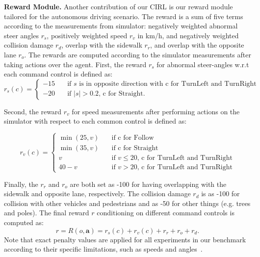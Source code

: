 \documentclass[runningheads]{llncs}
\begin{document}
\noindent\textbf{Reward Module.} Another contribution of our CIRL is our reward module tailored for the autonomous driving scenario. The reward is a sum of five terms according to the measurements from simulator: negatively weighted abnormal steer angles $r_s$, positively weighted speed $r_v$ in km/h, and negatively weighted collision damage $r_d$, overlap with the sidewalk $r_r$, and overlap with the opposite lane $r_o$. The rewards are computed according to the simulator measurements after taking actions over the agent. First, the reward $r_s$ for abnormal steer-angles w.r.t each command control is defined as:
\begin{equation}
     r_s(c) =
  \begin{cases}
    -15       & \quad \text{if } s \text{ is in opposite direction with c for TurnLeft and TurnRight}\\
    -20  & \quad \text{if } |s| > 0.2 \text{, c for Straight.}
  \end{cases}
\end{equation}

Second, the reward $r_v$ for speed measurements after performing actions on the simulator with respect to each common control is defined as:

\begin{equation}
     r_v(c) =
  \begin{cases}
    \min(25,v)      & \quad \text{if } \text{c for Follow}\\
    \min(35,v)  & \quad \text{if }\text{c for Straight}\\
    v & \quad \text{if } v \leq 20 \text{, c for TurnLeft and TurnRight}\\
    40 - v & \quad \text{if } v > 20 \text{, c for TurnLeft and TurnRight}
  \end{cases}
\end{equation}

Finally, the $r_r$ and $r_o$ are both set as -100 for having overlapping with the sidewalk and opposite lane, respectively. The collision damage $r_d$ is as -100 for collision with other vehicles and pedestrians and as -50 for other things (e.g. trees and poles). The final reward $r$ conditioning on different command controls is computed as:
\begin{equation}
   r = R(o,\mathbf{a}) = r_s(c) + r_v(c) + r_r + r_o + r_d.
\end{equation}
Note that exact penalty values are applied for all experiments in our benchmark according to their specific limitations, such as speeds and angles~\cite{dosovitskiy2017carla}.
\end{document}
